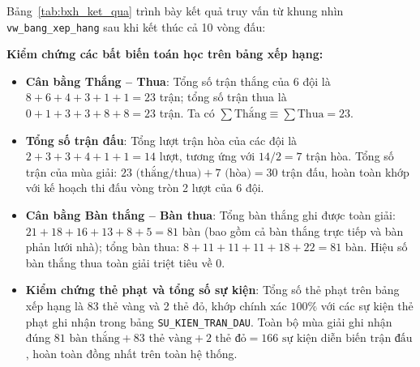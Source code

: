 Bảng~\ref{tab:bxh_ket_qua} trình bày kết quả truy vấn từ khung nhìn \texttt{vw\_bang\_xep\_hang} sau khi kết thúc cả 10 vòng đấu:

\begin{table}[H]
\centering
\small
{}
\caption{Kết quả truy vấn bảng xếp hạng mùa giải từ cơ sở dữ liệu}
\label{tab:bxh_ket_qua}
\end{table}

\textbf{Kiểm chứng các bất biến toán học trên bảng xếp hạng:}
\begin{itemize}
    \item \textbf{Cân bằng Thắng -- Thua}: Tổng số trận thắng của 6 đội là $8 + 6 + 4 + 3 + 1 + 1 = 23$ trận; tổng số trận thua là $0 + 1 + 3 + 3 + 8 + 8 = 23$ trận. Ta có $\sum \text{Thắng} \equiv \sum \text{Thua} = 23$.
    \item \textbf{Tổng số trận đấu}: Tổng lượt trận hòa của các đội là $2 + 3 + 3 + 4 + 1 + 1 = 14$ lượt, tương ứng với $14 / 2 = 7$ trận hòa. Tổng số trận của mùa giải: $23 \text{ (thắng/thua)} + 7 \text{ (hòa)} = 30$ trận đấu, hoàn toàn khớp với kế hoạch thi đấu vòng tròn 2 lượt của 6 đội.
    \item \textbf{Cân bằng Bàn thắng -- Bàn thua}: Tổng bàn thắng ghi được toàn giải: $21 + 18 + 16 + 13 + 8 + 5 = 81$ bàn (bao gồm cả bàn thắng trực tiếp và bàn phản lưới nhà); tổng bàn thua: $8 + 11 + 11 + 11 + 18 + 22 = 81$ bàn. Hiệu số bàn thắng thua toàn giải triệt tiêu về $0$.
    \item \textbf{Kiểm chứng thẻ phạt và tổng số sự kiện}: Tổng số thẻ phạt trên bảng xếp hạng là 83 thẻ vàng và 2 thẻ đỏ, khớp chính xác $100\%$ với các sự kiện thẻ phạt ghi nhận trong bảng \texttt{SU\_KIEN\_TRAN\_DAU}. Toàn bộ mùa giải ghi nhận đúng $81 \text{ bàn thắng} + 83 \text{ thẻ vàng} + 2 \text{ thẻ đỏ} = 166 \text{ sự kiện diễn biến trận đấu}$, hoàn toàn đồng nhất trên toàn hệ thống.
\end{itemize}

